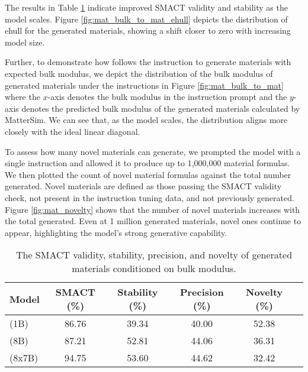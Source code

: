The results in Table \ref{tab:bulk_to_mat} indicate improved SMACT validity and stability as the model scales. Figure \ref{fig:mat_bulk_to_mat_ehull} depicts the distribution of ehull for the generated materials, showing a shift closer to zero with increasing model size. 


Further, to demonstrate how \ourM{} follows the instruction to generate materials with expected bulk modulus, we depict the distribution of the bulk modulus of generated materials under the instructions in Figure \ref{fig:mat_bulk_to_mat} where the $x$-axis denotes the bulk modulus in the instruction prompt and the $y$-axis denotes the predicted bulk modulus of the generated materials calculated by MatterSim. We can see that, as the model scales, the distribution aligns more closely with the ideal linear diagonal. 

To assess how many novel materials \ourM{} can generate, we prompted the model with a single instruction and allowed it to produce up to 1,000,000 material formulas. We then plotted the count of novel material formulas against the total number generated. Novel materials are defined as those passing the SMACT validity check, not present in the instruction tuning data, and not previously generated. Figure \ref{fig:mat_novelty} shows that the number of novel materials increases with the total generated. Even at 1 million generated materials, novel ones continue to appear, highlighting the model's strong generative capability.

\begin{table}[!htbp]
\centering
\begin{tabular}{lccccc}
\toprule
Model & SMACT (\%) & Stability (\%) & Precision (\%) & Novelty (\%) \\
\midrule
\ourM{} (1B) & 86.76 & 39.34 & 40.00 & 52.38 \\
\ourM{} (8B) & 87.21 & 52.81 & 44.06 & 36.31 \\
\ourM{} (8x7B) & 94.75 & 53.60 & 44.62 & 32.42 \\
\bottomrule
\end{tabular}
\caption{The SMACT validity, stability, precision, and novelty of generated materials conditioned on bulk modulus.}
\label{tab:bulk_to_mat}
\end{table}

